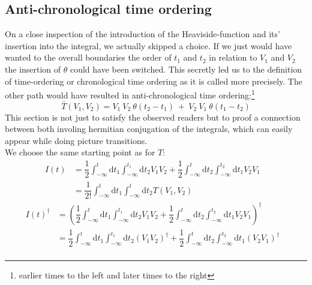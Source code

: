 \documentclass[12pt, titlepage]{article}
\begin{document}
\begin{subappendices}
\subsection{Anti-chronological time ordering}\label{anti_chronological_time}
On a close inspection of the introduction of the Heaviside-function and its' insertion into the integral, we actually skipped a choice. If we just would have wanted to the overall boundaries the order of $ t_1 $ and $ t_2 $ in relation to $ V_1 $ and $ V_2 $ the insertion of $  \theta$  could have been switched. This secretly led us to the definition of time-ordering or chronological time ordering as it is called more precisely. The other path would have resulted in anti-chronological time ordering:\footnote{
earlier times to the left and later times to the right
}
\begin{equation}\label{anti_o}
 \bar{T}(V_1,V_2)
 =
 V_1\ V_2\ \theta (t_2 -t_1)\ +\ V_2\  V_1 \ \theta (t_1-t_2)
\end{equation} 
This section is not just to satisfy the observed readers but to proof a connection between both involing hermitian conjugation of the integrals, which can easily appear while doing picture transitions.
\\
We choose the same starting point as for $ T $:
\begin{align*}
  I(t)
  &= \dfrac{1}{2}
	 \int_{-\infty}^{t}\mathrm{d}t_1\int_{-\infty}^{t_1}\! \! \mathrm{d}t_2
	 V_1 V_2
	+
	\dfrac{1}{2}
	\int_{-\infty}^{t}\mathrm{d}t_2\int_{-\infty}^{t_2}\! \! \mathrm{d}t_1
	V_2 V_1
	 &\\
  &= \dfrac{1}{2!}
	 \int_{-\infty}^{t}\mathrm{d}t_1\int_{-\infty}^{t}\! \! \mathrm{d}t_2
	 T(V_1,V_2)
\end{align*}
\begin{subequations}
\begin{align}
  I(t)^{\dagger}
  &=\left(  \dfrac{1}{2}
	 \int_{-\infty}^{t}\mathrm{d}t_1\int_{-\infty}^{t_1}\! \! \mathrm{d}t_2
	 V_1 V_2
	+
	\dfrac{1}{2}
	\int_{-\infty}^{t}\mathrm{d}t_2\int_{-\infty}^{t_2}\! \! \mathrm{d}t_1
	V_2 V_1
	\right) ^{\dagger}
	 &\\
  &=  \dfrac{1}{2}
	 \int_{-\infty}^{t}\mathrm{d}t_1\int_{-\infty}^{t_1}\! \! \mathrm{d}t_2
	 \left(V_1 V_2\right) ^{\dagger}
	+
	\dfrac{1}{2}
	\int_{-\infty}^{t}\mathrm{d}t_2\int_{-\infty}^{t_2}\! \! \mathrm{d}t_1
	\left( V_2 V_1\right) ^{\dagger}
	&\\	

\end{align}
\end{subequations}
\end{subappendices}
\end{document}
